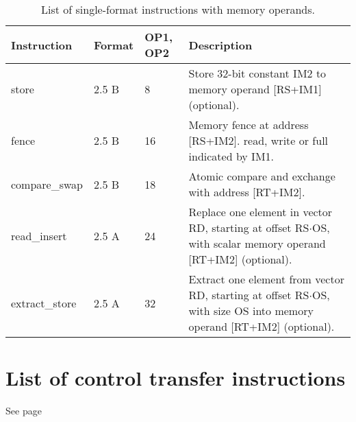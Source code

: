 \documentclass[forwardcom.tex]{subfiles}
\begin{document}
\begin{longtable} {|p{20mm}|p{10mm}|p{8mm}|p{75mm}|}
\caption{List of single-format instructions with memory operands.} 
\label{table:ListOfSingleFormatInstructionsMemory} \\
\endfirsthead
\endhead
\hline
\bfseries Instruction & \bfseries Format &\bfseries OP1, OP2 & \bfseries Description \\
\hline
store         & 2.5 B &  8 & Store 32-bit constant IM2 to memory operand [RS+IM1] (optional). \\

fence         & 2.5 B & 16 & Memory fence at address [RS+IM2]. read, write or full indicated by IM1.\\

compare\_swap & 2.5 B & 18 & Atomic compare and exchange with address [RT+IM2].\\

read\_insert  & 2.5 A & 24 & Replace one element in vector RD, starting at offset 
RS$\cdot$OS, with scalar memory operand [RT+IM2] (optional).  \\

extract\_store& 2.5 A & 32 & Extract one element from vector RD, starting at offset RS$\cdot$OS, with size OS into memory operand [RT+IM2] (optional). \\

\hline
\end{longtable}


\section{List of control transfer instructions}
See page \pageref{table:controlTransferInstructions}
\end{document}

